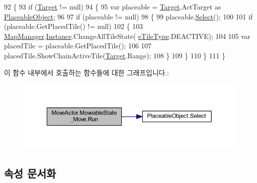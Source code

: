 \begin{DoxyCode}
92         \{
93             \textcolor{keywordflow}{if} (\hyperlink{class_m_c_n_1_1_state_a93ba2fd920292031bd6e65b1dc505cb3}{Target} != null)
94             \{
95                 var placeable = \hyperlink{class_m_c_n_1_1_state_a93ba2fd920292031bd6e65b1dc505cb3}{Target}.ActTarget as \hyperlink{class_placeable_object}{PlaceableObject};
96 
97                 \textcolor{keywordflow}{if} (placeable != null)
98                 \{
99                     placeable.\hyperlink{class_placeable_object_a019818f3f6c6eb715fed163efa921f5a}{Select}();
100 
101                     \textcolor{keywordflow}{if} (placeable.GetPlacedTile() != null)
102                     \{
103                         \hyperlink{class_map_manager}{MapManager}.\hyperlink{class_m_c_n_1_1_mono_singletone_aa50c027cca64cf4ad30c1ee5c83e0b78}{Instance}.ChangeAllTileState(
      \hyperlink{_tile_8cs_a271bc07be325bca511bcb747e0ff2fda}{eTileType}.DEACTIVE);
104 
105                         var placedTile = placeable.GetPlacedTile();
106 
107                         placedTile.ShowChainActiveTile(\hyperlink{class_m_c_n_1_1_state_a93ba2fd920292031bd6e65b1dc505cb3}{Target}.Range);
108                     \}
109                 \}
110             \}
111         \}
\end{DoxyCode}


이 함수 내부에서 호출하는 함수들에 대한 그래프입니다.\+:\nopagebreak
\begin{figure}[H]
\begin{center}
\leavevmode
\includegraphics[width=350pt]{class_move_actor_1_1_moveable_state___move_a81659255954f8ff95fcac87a0cfd3c73_cgraph}
\end{center}
\end{figure}




\subsection{속성 문서화}
